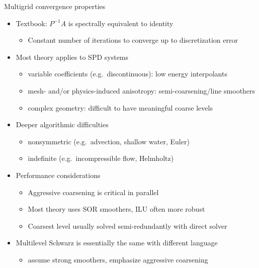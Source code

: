 \begin{frame}{Multigrid convergence properties}
  \begin{itemize}
  \item Textbook: $P^{-1}A$ is spectrally equivalent to identity
    \begin{itemize}
    \item Constant number of iterations to converge up to discretization error
    \end{itemize}
  \item Most theory applies to SPD systems
    \begin{itemize}
    \item variable coefficients (e.g.~discontinuous): low energy interpolants
    \item mesh- and/or physics-induced anisotropy: semi-coarsening/line smoothers
    \item complex geometry: difficult to have meaningful coarse levels
    \end{itemize}
  \item Deeper algorithmic difficulties
    \begin{itemize}
    \item nonsymmetric (e.g.~advection, shallow water, Euler) \\
    \item indefinite (e.g.~incompressible flow, Helmholtz)
    \end{itemize}
  \item Performance considerations
    \begin{itemize}
    \item Aggressive coarsening is critical in parallel
    \item Most theory uses SOR smoothers, ILU often more robust
    \item Coarsest level usually solved semi-redundantly with direct solver
    \end{itemize}
  \item Multilevel Schwarz is essentially the same with different language
    \begin{itemize}
    \item assume strong smoothers, emphasize aggressive coarsening
    \end{itemize}
  \end{itemize}
\end{frame}
